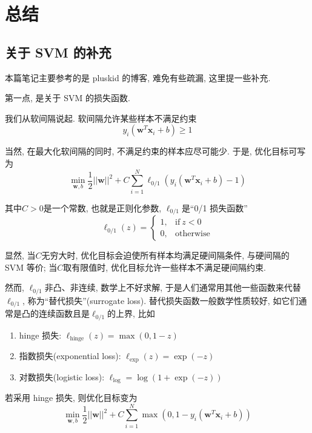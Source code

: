 \documentclass[a4paper,UTF8]{ctexart}
\theoremstyle{plain} \newtheorem{theorem}{定理}[section]
\theoremstyle{plain} \newtheorem{definition}{定义}[section]
\theoremstyle{plain} \newtheorem{lemma}{引理}[section]
\theoremstyle{plain} \newtheorem{proposition}{命题}[section]
\theoremstyle{plain} \newtheorem{example}{例}
\theoremstyle{plain} \newtheorem{remark}{注}
\theoremstyle{plain} \newtheorem{corollary}{推论}[section]
\begin{document}
\section{总结}
\subsection{关于 SVM 的补充}
本篇笔记主要参考的是 pluskid 的博客, 难免有些疏漏, 这里提一些补充. 

第一点, 是关于 SVM 的损失函数. 

我们从软间隔说起. 软间隔允许某些样本不满足约束
\begin{equation*}
y_i (\bm{w}^T \bm{x}_i + b) \geqslant 1
\end{equation*}

当然, 在最大化软间隔的同时, 不满足约束的样本应尽可能少. 于是, 优化目标可写为
\begin{equation*}
\min_{\bm{w}, b} \frac{1}{2} ||\bm{w}||^2 + C \sum_{i=1}^{N} \ell_{0 / 1} (y_i (\bm{w}^T \bm{x}_i + b) - 1)
\end{equation*}

其中$C > 0$是一个常数, 也就是正则化参数, $\ell_{0 / 1}$是“0/1 损失函数”
$$
\ell_{0 / 1}(z) = 
\begin{cases}
1, & \mathrm{if} ~ z < 0 \\ 
0, & \mathrm{otherwise}
\end{cases}
$$

显然, 当$C$无穷大时, 优化目标会迫使所有样本均满足硬间隔条件, 与硬间隔的 SVM 等价; 当$C$取有限值时, 优化目标允许一些样本不满足硬间隔约束.

然而, $\ell_{0 / 1}$非凸、非连续, 数学上不好求解, 于是人们通常用其他一些函数来代替$\ell_{0 / 1}$, 称为“替代损失”(surrogate loss). 替代损失函数一般数学性质较好, 如它们通常是凸的连续函数且是$\ell_{0 / 1}$的上界, 比如
\begin{enumerate}[(1)]
\item hinge 损失: $\ell_{\mathrm{hinge}}(z) = \max (0, 1 - z)$

\item 指数损失(exponential loss): $\ell_{\mathrm{exp}}(z) = \exp (-z)$

\item 对数损失(logistic loss): $\ell_{\mathrm{log}} = \log (1 + \exp (-z))$

\end{enumerate}

若采用 hinge 损失, 则优化目标变为
\begin{equation*}
\min_{\bm{w}, b} \frac{1}{2} ||\bm{w}||^2 + C \sum_{i=1}^{N} \max (0, 1 - y_i (\bm{w}^T \bm{x}_i + b))
\end{equation*}
\end{document}
